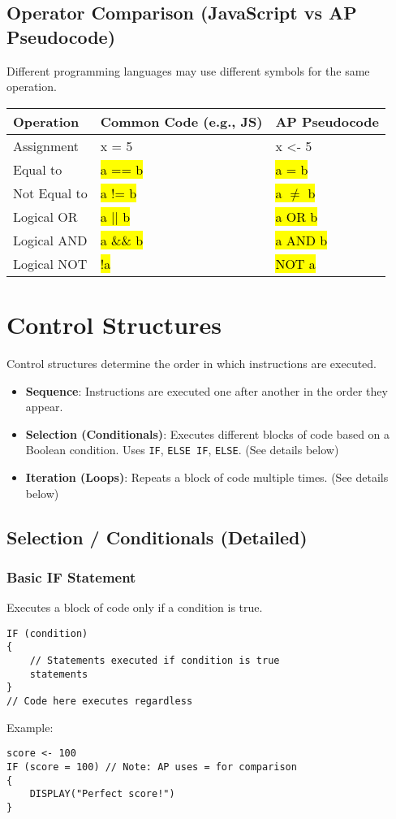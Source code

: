 \documentclass[11pt,oneside]{book}
\newcommand{\hlc}[2][hlyellow]{\sethlcolor{#1}\hl{#2}}
\begin{document}
\subsection*{Operator Comparison (JavaScript vs AP Pseudocode)}
Different programming languages may use different symbols for the same operation.

\begin{tabularx}{\textwidth}{l >{\ttfamily}l >{\ttfamily}l}
\toprule
\textbf{Operation} & \textbf{Common Code (e.g., JS)} & \textbf{AP Pseudocode} \\
\midrule
Assignment & x = 5 & x <- 5 \\
Equal to & \hlc[hlyellow]{a == b} & \hlc[hlyellow]{a = b} \\
Not Equal to & \hlc[hlyellow]{a != b} & \hlc[hlyellow]{a $\neq$ b} \\
Logical OR & \hlc[hlred]{a || b} & \hlc[hlred]{a OR b} \\
Logical AND & \hlc[hlred]{a \&\& b} & \hlc[hlred]{a AND b} \\
Logical NOT & \hlc[hlred]{!a} & \hlc[hlred]{NOT a} \\
\bottomrule
\end{tabularx}

\section{Control Structures}
\label{sec:control_structures}
Control structures determine the order in which instructions are executed.
\begin{itemize}
    \item \textbf{Sequence}: Instructions are executed one after another in the order they appear.
    \item \textbf{Selection (Conditionals)}: Executes different blocks of code based on a Boolean condition. Uses \texttt{IF}, \texttt{ELSE IF}, \texttt{ELSE}. (See details below)
    \item \textbf{Iteration (Loops)}: Repeats a block of code multiple times. (See details below)
\end{itemize}

\subsection*{Selection / Conditionals (Detailed)}

\subsubsection*{Basic IF Statement}
Executes a block of code only if a condition is true.
\begin{lstlisting}[language={}, label={lst:basic_if}, caption={AP Pseudocode: Basic IF}]
IF (condition)
{
    // Statements executed if condition is true
    statements
}
// Code here executes regardless
\end{lstlisting}
Example:
\begin{lstlisting}[language={}]
score <- 100
IF (score = 100) // Note: AP uses = for comparison
{
    DISPLAY("Perfect score!")
}
\end{lstlisting}
\end{document}
